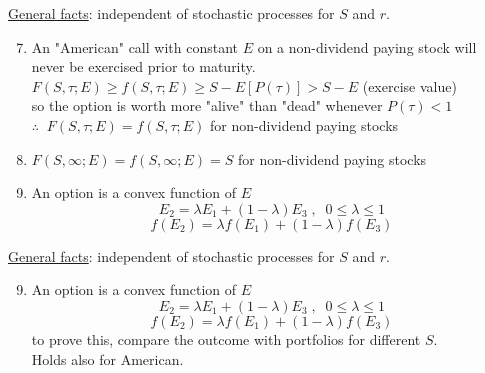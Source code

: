 \documentclass[
14pt,notheorems,hyperref={pdfauthor=whatever}
]{beamer}
\begin{document}
\begin{frame}
\underline{General facts}: independent of stochastic processes for $S$ and $r$.\\
\hfill
\begin{enumerate}
    \setcounter{enumi}{6}
    \item An "American" call with constant $E$ on a non-dividend paying stock will never be exercised prior to maturity.\\
    \hfill
    $F(S,\tau;E) \geq f(S,\tau;E) \geq S - E[P(\tau)] > S-E$ (exercise value)\\
    \hfill
    so the option is worth more "alive" than "dead" whenever $P(\tau) < 1$\\
    \hfill
    $\therefore \;\; F(S,\tau;E) = f(S,\tau;E)$ for non-dividend paying stocks\\
    \hfill
    \item $F(S,\infty;E) = f(S,\infty;E) = S$ for non-dividend paying stocks\\
    \hfill
    \item An option is a convex function of $E$\\
    \[E_2 = \lambda E_1 + (1-\lambda)E_3\;,\;\;0 \leq \lambda \leq 1\]
    \[f(E_2) = \lambda f(E_1) + (1-\lambda)f(E_3)\]
\end{enumerate}
\hfill\break
\end{frame}

\begin{frame}
\underline{General facts}: independent of stochastic processes for $S$ and $r$.\\
\hfill
\begin{enumerate}
    \setcounter{enumi}{8}
    \item An option is a convex function of $E$\\
    \[E_2 = \lambda E_1 + (1-\lambda)E_3\;,\;\;0 \leq \lambda \leq 1\]
    \[f(E_2) = \lambda f(E_1) + (1-\lambda)f(E_3)\]
    to prove this, compare the outcome with portfolios for different $S$.\\
    \hfill
    Holds also for American.\\
    \hfill
\end{enumerate}
\end{frame}
\end{document}
